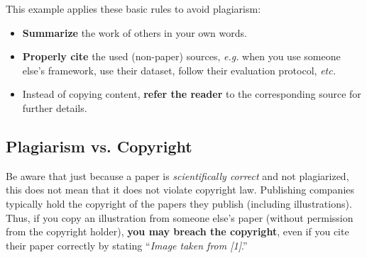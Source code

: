 \documentclass[11pt,a4paper]{article}
\begin{document}
\begin{goodexample}
  \label{ex-avoid-plagiarism}

  \begin{figure}[H]
    \centering%
    {%
      \setlength{\fboxsep}{0pt}%
      \setlength{\fboxrule}{2pt}%
    }
  \end{figure}
This example applies these basic rules to avoid plagiarism:
\vspace{0.5em}
  \begin{itemize}
    \item \textbf{Summarize} the work of others in your own words.
    \item \textbf{Properly cite} the used (non-paper) sources, \emph{e.g.} when you use someone else's framework, use their dataset, follow their evaluation protocol, \emph{etc.}
    \item Instead of copying content, \textbf{refer the reader} to the corresponding source for further details.
  \end{itemize}
\end{goodexample}


\subsection{Plagiarism vs. Copyright}
Be aware that just because a paper is \emph{scientifically correct} and not plagiarized, this does not mean that it does not violate copyright law.
Publishing companies typically hold the copyright of the papers they publish (including illustrations).
Thus, if you copy an illustration from someone else's paper (without permission from the copyright holder), \textbf{you may breach the copyright}, even if you cite their paper correctly by stating ``\emph{Image taken from [1]}.''
\end{document}
